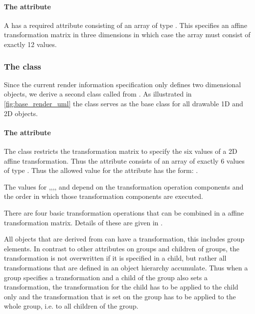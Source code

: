 \paragraph{The \fixttspace{} attribute}

A \Transformation has a required attribute  consisting
of an array of type . This specifies an affine transformation matrix in three dimensions in which case the array must consist of exactly 12 values.

\subsubsection{The  class}
\label{transformationtwod-class}

Since the current render information specification only defines two dimensional objects, we derive a second class called \TransformationTwoD from \Transformation. As illustrated in \ref{fig:base_render_uml} the class \TransformationTwoD serves as the base class for all drawable 1D and 2D objects.

\paragraph{The \fixttspace{} attribute}

The \TransformationTwoD class restricts the transformation matrix to specify the six values of a 2D affine transformation. Thus the  attribute consists of an array of exactly 6 values of type . Thus the allowed 
value for the attribute has the form: .

The values for ,,,, and  depend on the transformation operation components and the order in which those transformation components are executed.

There are four basic transformation operations that can be combined in a affine transformation matrix.  Details of these are given in .

All objects that are derived from \TransformationTwoD can have a transformation, this includes group elements. In contrast to other attributes on groups and children of groups, the transformation is not overwritten if it is specified in a child, but rather all transformations that are defined in an object hierarchy accumulate. Thus when a group specifies a transformation and a child of the group also sets a transformation, the transformation for the child has to be applied to the child only and the transformation that is set on the group has to be applied to the whole group, i.e. to all children of the group.

